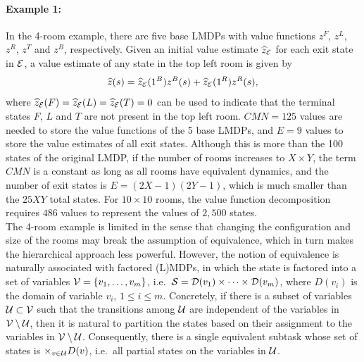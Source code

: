 \paragraph{Example 1:} %
In the 4-room example, there are five base LMDPs with value functions $z^F$, $z^L$, $z^R$, $z^T$ and $z^B$, respectively. Given an initial value estimate $\widehat{z}_{\mathcal{E}}$ for each exit state in $\mathcal{E}$, a value estimate of any state in the top left room is given by \[\linebreak\widehat{z}(s)=\widehat{z}_\cE(1^B) z^B(s) + \widehat{z}_\cE(1^R) z^R(s),\] where $\widehat{z}_{\mathcal{E}}(F)=\widehat{z}_{\mathcal{E}}(L)=\widehat{z}_{\mathcal{E}}(T)=0$ can be used to indicate that the terminal states $F$, $L$ and $T$ are not present in the top left room. $CMN = 125$ values are needed to store the value functions of the 5 base LMDPs, and $E=9$ values to store the value estimates of all exit states. Although this is more than the 100 states of the original LMDP, if the number of rooms increases to $X\times Y$, the term $CMN$ is a constant as long as all rooms have equivalent dynamics, and the number of exit states is $E=(2X-1)(2Y-1)$, which is much smaller than the $25 XY$ total states. For $10\times 10$ rooms, the value function decomposition requires $486$ values to represent the values of $2{,}500$ states.\\

The 4-room example is limited in the sense that changing the configuration and size of the rooms may break the assumption of equivalence, which in turn makes the hierarchical approach less powerful. However, the notion of equivalence is naturally associated with factored (L)MDPs, in which the state is factored into a set of variables $\mathcal{V}=\{v_1,\ldots,v_m\}$, i.e.~$\mathcal{S}=\mathcal{D}(v_1)\times\cdots\times\mathcal{D}(v_m)$, where $D(v_i)$ is the domain of variable $v_i$, $1\leq i\leq m$.
Concretely, if there is a subset of variables $\mathcal{U}\subset\mathcal{V}$ such that the transitions among $\mathcal{U}$ are independent of the variables in $\mathcal{V}\setminus\mathcal{U}$, then it is natural to partition the states based on their assignment to the variables in $\mathcal{V}\setminus\mathcal{U}$. Consequently, there is a single equivalent subtask whose set of states is $\times_{v\in\mathcal{U}}D(v)$, i.e.~all partial states on the variables in $\mathcal{U}$.


